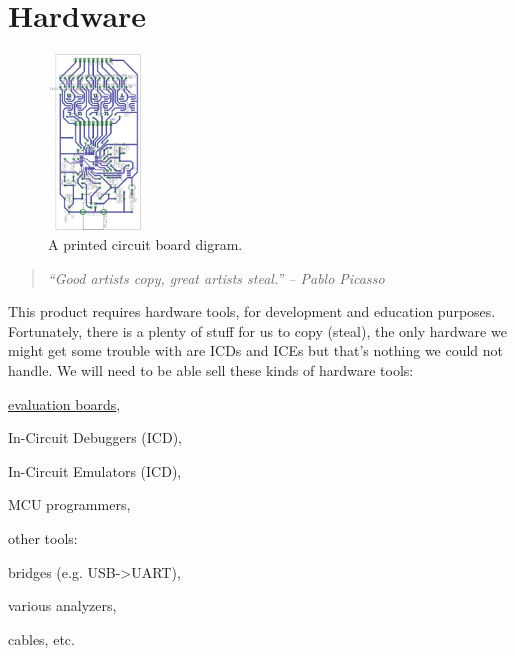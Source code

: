 \documentclass[a4paper,twoside,15pt]{book}
\begin{document}
	\clearpage
	\section{Hardware}
		\begin{figure}
			\centering{}
			\includegraphics[width=70pt]{images/ft232bm_dev_brd_board_placeplan2.png}
			\caption{A printed circuit board digram.}
		\end{figure}
		\begin{quote}
			\textit{``Good artists copy, great artists steal.'' -- Pablo Picasso}
		\end{quote}

		This product requires hardware tools, for development and education purposes. Fortunately, there is a plenty of stuff for us to copy (steal), the only hardware we might get some trouble with are ICDs and ICEs but that's nothing we could not handle. We will need to be able sell these kinds of hardware tools:
		\begin{dinglist}{73}
			\setlength{\itemsep}{-3pt}
			\item \href{https://www.google.com/search?q=PIC+Evaluation+board&hl=en&client=ubuntu&hs=tNv&channel=fs&prmd=imvns&tbm=isch&tbo=u&source=univ&sa=X&ei=vA0GT8-4LpGk4ASA_aDfBA&ved=0CHgQsAQ&biw=1600&bih=761}{evaluation boards},
			\item In-Circuit Debuggers (ICD),
			\item In-Circuit Emulators (ICD),
			\item MCU programmers,
			\item other tools:
				\begin{dinglist}{75}
					\setlength{\itemsep}{-3pt}
					\item bridges (e.g. USB->UART),
					\item various analyzers,
					\item cables, etc.
				\end{dinglist}
		\end{dinglist}
\end{document}
